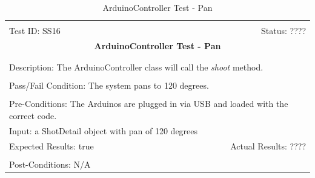 \documentclass[11pt]{article}
\begin{document}
\begin{center}
\begin{table}[H]
\begin{tabular}{|l r|}\hline&\\[-2mm]
	Test ID: SS16	&Status: ????\\[-3mm]
	\multicolumn{2}{|c|}{\textbf{\large{ArduinoController Test - Pan}}}\\&\\\hline&\\[-3mm]
	\multicolumn{2}{|p{\textwidth}|}{Description: The ArduinoController class will call the \textit{shoot} method.}\\[1mm]\hline&\\[-3mm]
	\multicolumn{2}{|p{\textwidth}|}{Pass/Fail Condition: The system pans to 120 degrees.}\\[1mm]\hline&\\[-3mm]
	\multicolumn{2}{|p{\textwidth}|}{Pre-Conditions: The Arduinos are plugged in via USB and loaded with the correct code.}\\[4mm]
	\multicolumn{2}{|p{\textwidth}|}{Input: a ShotDetail object with pan of 120 degrees}\\[2mm]\hline
	\multicolumn{1}{|p{0.49\textwidth}}{Expected Results: true}	&\multicolumn{1}{|p{0.45\textwidth}|}{Actual Results: ????}\\\hline&\\[-3mm]
	\multicolumn{2}{|p{\textwidth}|}{Post-Conditions: N/A}\\\hline
\end{tabular}
\caption{ArduinoController Test - Pan}
\end{table}
\end{center}
\end{document}
